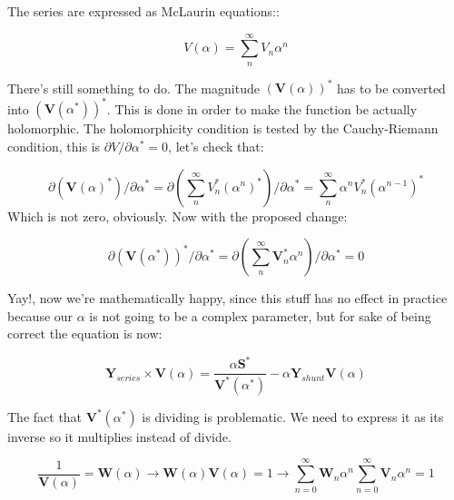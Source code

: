 \documentclass[11pt,fleqn]{book} %
\begin{document}
The series are expressed as McLaurin equations::

\begin{equation}
V(\alpha) = \sum_{n}^{\infty} V_n \alpha ^n
\label{eq:McLaurinV}
\end{equation}

\begin{theorem}

There's still something to do. The magnitude $\left(\textbf{V}( \alpha )\right)^*$ has to be converted into $\left(\textbf{V}( \alpha^* )\right)^*$. This is done in order to make the function be actually holomorphic. The holomorphicity condition is tested by the Cauchy-Riemann condition, this is $\partial V / \partial \alpha^* = 0$, let's check that:

\begin{equation}
\partial \left(\textbf{V}( \alpha )^*\right) / \partial \alpha^*  = \partial \left(\sum_{n}^{\infty} V_n^* (\alpha ^n)^*\right) / \partial \alpha^*  = \sum_{n}^{\infty} \alpha ^n V_n^* (\alpha ^{n-1})^*
\end{equation} 
Which is not zero, obviously. Now with the proposed change:

\begin{equation}
\partial \left( \textbf{V}( \alpha^* )\right)^* / \partial \alpha^*  = \partial \left(\sum_{n}^{\infty} \textbf{V}_n^* \alpha ^n \right) / \partial \alpha^*  = 0
\end{equation} 

Yay!, now we're mathematically happy, since this stuff has no effect in practice because our $\alpha$ is not going to be a complex parameter, but for sake of being correct the equation is now:

\begin{equation}
{\textbf{Y}_{series}\times \textbf{V}( \alpha )} = \frac{ \alpha\textbf{S}^*}{\textbf{V}^*( \alpha^* )} - \alpha \textbf{Y}_{shunt} \textbf{V}( \alpha )
\label{base_eq_embedded2}
\end{equation}

\end{theorem}


The fact that $\textbf{V}^*( \alpha^* )$ is dividing is problematic. We need to express it as its inverse so it multiplies instead of divide.

\begin{equation} 
\frac{1}{\textbf{V}( \alpha)} = \textbf{W}( \alpha ) \longrightarrow \textbf{W}( \alpha ) \textbf{V}( \alpha) = 1 \longrightarrow \sum_{n=0}^{\infty}{\textbf{W}_n \alpha^n}  \sum_{n=0}^{\infty}{\textbf{V}_n \alpha^n} = 1
\end{equation}
\end{document}
